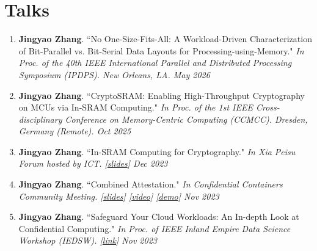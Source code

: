 \documentclass[letterpaper,11pt]{article}
\begin{document}
\section{Talks}
\vspace{2pt}
   \begin{enumerate}[leftmargin=*, labelindent=12pt, label=\arabic*., topsep=0pt, partopsep=0pt, parsep=0pt, itemsep=3pt]
    \small
        \item \textbf{Jingyao Zhang}. ``No One-Size-Fits-All: A Workload-Driven Characterization of Bit-Parallel vs. Bit-Serial Data Layouts for Processing-using-Memory." \textit{In Proc. of the 40th IEEE International Parallel and Distributed Processing Symposium (IPDPS). New Orleans, LA.
        \hfill May 2026} \vspace{-2pt}
        \item \textbf{Jingyao Zhang}. ``CryptoSRAM: Enabling High-Throughput Cryptography on MCUs via In-SRAM Computing." \textit{In Proc. of the 1st IEEE Cross-disciplinary Conference on Memory-Centric Computing (CCMCC). Dresden, Germany (Remote).
        \hfill Oct 2025} \vspace{-2pt}
        \item \textbf{Jingyao Zhang}. ``In-SRAM Computing for Cryptography." \textit{In Xia Peisu Forum hosted by ICT. \emph{[\href{https://jingyao-zhang.github.io/slides/XiaPeisu.pdf}{slides}]}
        \hfill Dec 2023} \vspace{-2pt}
        
        \item \textbf{Jingyao Zhang}. ``Combined Attestation." \textit{In Confidential Containers Community Meeting. \emph{[\href{https://docs.google.com/presentation/d/1EbxBZL8DJf4skoyJklNx00zee0HalzV3Y9R76WWISQE/edit?usp=sharing}{slides}]
        [\href{https://zoom.us/rec/share/7yI2fIOceuSYvAtdZPwnzj6PYlGYJ3ABvOX5X8voL3tFHg6KREivf_V9Qp0ANTRI.-PtnE-Fj4pb8lN1Z}{video}]
        [\href{https://www.youtube.com/watch?v=PUM6HVjNAm8}{demo}]}
        \hfill Nov 2023} \vspace{-2pt}
        
        \item \textbf{Jingyao Zhang}. ``Safeguard Your Cloud Workloads: An In-depth Look at Confidential Computing." \textit{In Proc. of IEEE Inland Empire Data Science Workshop (IEDSW). \emph{[\href{https://sites.google.com/ucr.edu/ieee-inlandempire-dsw}{link}]}
        \hfill Nov 2023} \vspace{-2pt}
        

\end{enumerate}
\end{document}
